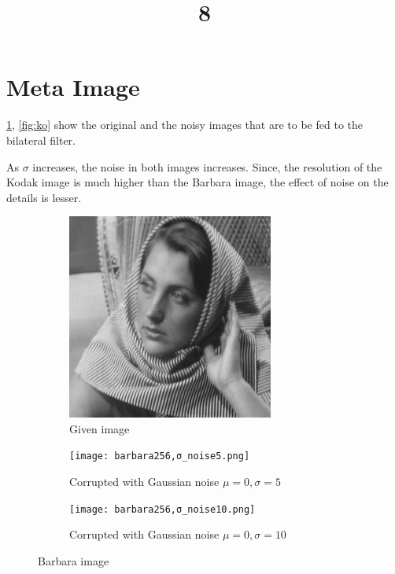 \documentclass[a4paper, landscape]{article}
\title{8}
\date{}
\begin{document}
\maketitle
\section{Meta Image}
\ref{fig:bo}, \ref{fig:ko} show the original and the noisy images that are to be fed to  the bilateral filter.

As $\sigma$ increases, the noise in both images increases. 
Since, the resolution of the Kodak image is much higher than the Barbara image, the effect of noise on the details is lesser.
\begin{figure}
    \centering
    \begin{subfigure}{0.33\linewidth}
        \centering
        \includegraphics[width=\linewidth]{barbara256.png}
        \caption{Given image}
    \end{subfigure}
    \begin{subfigure}{0.33\linewidth}
        \centering
        \texttt{[image: barbara256,σ\_noise5.png]}
        \caption{Corrupted with Gaussian noise $\mu=0, \sigma=5$}
    \end{subfigure}
    \begin{subfigure}{0.33\linewidth}
        \centering
        \texttt{[image: barbara256,σ\_noise10.png]}
        \caption{Corrupted with Gaussian noise $\mu=0, \sigma=10$}
    \end{subfigure}
    \caption{Barbara image}
    \label{fig:bo}
\end{figure}
\end{document}
